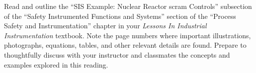 

Read and outline the ``SIS Example: Nuclear Reactor scram Controls'' subsection of the ``Safety Instrumented Functions and Systems'' section of the ``Process Safety and Instrumentation'' chapter in your {\it Lessons In Industrial Instrumentation} textbook.  Note the page numbers where important illustrations, photographs, equations, tables, and other relevant details are found.  Prepare to thoughtfully discuss with your instructor and classmates the concepts and examples explored in this reading.
















